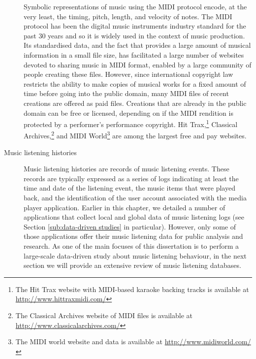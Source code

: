 \begin{description}
Symbolic representations of music using the MIDI protocol encode, at the very least, the timing, pitch, length, and velocity of notes. The MIDI protocol has been the digital music instruments industry standard for the past 30 years and so it is widely used in the context of music production. 
Its standardised data, and the fact that provides a large amount of musical information in a small file size, has facilitated a large number of websites devoted to sharing music in MIDI format, enabled by a large community of people creating these files. 
However, since international copyright law restricts the ability to make copies of musical works for a fixed amount of time before going into the public domain, many MIDI files of recent creations are offered as paid files. Creations that are already in the public domain can be free or licensed, depending on if the MIDI rendition is protected by a performer's performance copyright.
Hit Trax,\footnote{The Hit Trax website with MIDI-based karaoke backing tracks is available at \url{http://www.hittraxmidi.com/}} Classical Archives,\footnote{The Classical Archives website of MIDI files is available at \url{http://www.classicalarchives.com/}} and MIDI World\footnote{The MIDI world website and data is available at \url{http://www.midiworld.com/}} are among the largest free and pay websites.


\item [Music listening histories] Music listening histories are records of music listening events. These records are typically expressed as a series of logs indicating at least the time and date of the listening event, the music items that were played back, and the identification of the user account associated with the media player application.
Earlier in this chapter, we detailed  a number of applications that collect local and global data of music listening logs (see Section \ref{sub:data-driven studies} in particular). However, only some of those applications offer their music listening data for public analysis and research. 
As one of the main focuses of this dissertation is to perform a large-scale data-driven study about music listening behaviour, in the next section we will provide an extensive review of music listening databases.
\end{description}













